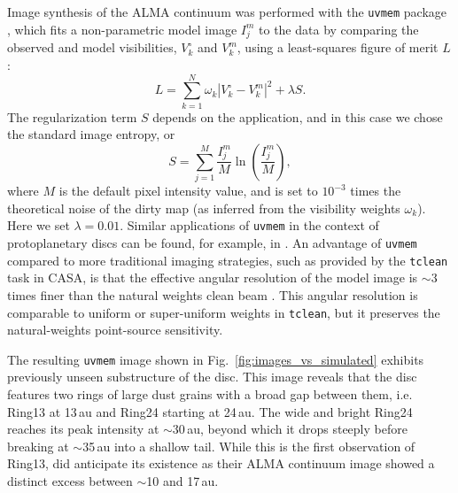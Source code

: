 \documentclass[letters,usenatbib,times]{mnras}
\begin{document}
Image synthesis of the ALMA continuum was performed with  the {\tt uvmem} package \citep{2006ApJ...639..951C, 2018A&C....22...16C}, which fits a non-parametric model image $I^m_j$ to the data by comparing the  observed  and model visibilities, $V^\circ_k$ and $V^m_k$, using a least-squares figure of merit $L$:
\begin{equation}
  L = \sum_{k=1}^N \omega_k  |V^\circ_k - V^m_k|^2 + \lambda S.
\end{equation}
The regularization term $S$ depends on the application, and in this case we chose the standard image entropy, or
\begin{equation}
S = \sum_{j=1}^M \frac{I_j^m}{M} \ln\left(\frac{I_j^m}{M}\right),
\end{equation}
where $M$ is the default pixel intensity value, and is set to $10^{-3}$ times the theoretical noise of the dirty map (as inferred from the visibility weights $\omega_k$). Here we set $\lambda = 0.01$.  Similar applications of {\tt uvmem} in the context of protoplanetary discs can be found, for example,  in \citet{Casassus2013Natur, 2018MNRAS.477.5104C, Casassus2019MNRAS.483.3278C,  Perez2019AJ....158...15P}.  An  advantage of {\tt uvmem} compared to more traditional imaging strategies, such as provided by the  {\tt tclean}   task in CASA, is that the effective angular resolution of the model image is  $\sim$3 times finer than the natural weights clean beam \citep[][]{2018A&C....22...16C}. This angular resolution is comparable to  uniform or super-uniform weights in {\tt tclean}, but it preserves the natural-weights point-source sensitivity. 

The resulting {\tt uvmem} image shown in Fig.~\ref{fig:images_vs_simulated} exhibits previously unseen substructure of the disc. This image reveals that the disc features two rings of large dust grains with a broad gap between them, i.e. Ring13 at 13\,au and Ring24 starting at 24\,au. The wide and bright Ring24 reaches its peak intensity at $\sim$30\,au, beyond which it drops steeply before breaking at $\sim$35\,au into a shallow tail. While this is the first observation of Ring13, \citet{Ru_z_Rodr_guez_2019} did anticipate its existence as their ALMA continuum image showed a distinct excess between $\sim$10 and 17\,au.
\end{document}
